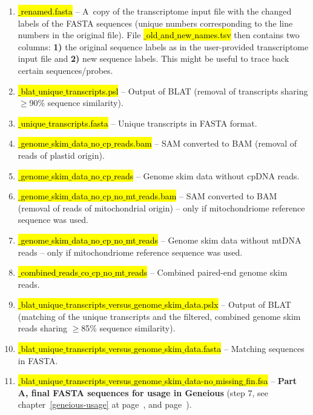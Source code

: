\documentclass[a4paper, 11pt, twoside]{article}
\renewcommand{\texttt}[1]{\hl{\ttfamily #1}}
\begin{document}
\begin{enumerate}
  \item \texttt{*$\_$renamed.fasta} -- A~copy of the transcriptome input file with the changed labels of the FASTA sequences (unique numbers corresponding to the line numbers in the original file). File \texttt{*$\_$old$\_$and$\_$new$\_$names.tsv} then contains two columns: \textbf{1)} the original sequence labels as in the user-provided transcriptome input file and \textbf{2)} new sequence labels. This might be useful to trace back certain sequences/probes.
  \item \texttt{*$\_$blat$\_$unique$\_$transcripts.psl} -- Output of BLAT (removal of transcripts sharing $\geq$90\% sequence similarity).
  \item \texttt{*$\_$unique$\_$transcripts.fasta} -- Unique transcripts in FASTA format.
  \item \texttt{*$\_$genome$\_$skim$\_$data$\_$no$\_$cp$\_$reads.bam} -- SAM converted to BAM (removal of reads of plastid origin).
  \item \texttt{*$\_$genome$\_$skim$\_$data$\_$no$\_$cp$\_$reads} -- Genome skim data without cpDNA reads.
  \item \texttt{*$\_$genome$\_$skim$\_$data$\_$no$\_$cp$\_$no$\_$mt$\_$reads.bam} -- SAM converted to BAM (removal of reads of mitochondrial origin)  -- only if mitochondriome reference sequence was used.
  \item \texttt{*$\_$genome$\_$skim$\_$data$\_$no$\_$cp$\_$no$\_$mt$\_$reads} -- Genome skim data without mtDNA reads -- only if mitochondriome reference sequence was used.
  \item \texttt{*$\_$combined$\_$reads$\_$co$\_$cp$\_$no$\_$mt$\_$reads} -- Combined paired-end genome skim reads.
  \item \texttt{*$\_$blat$\_$unique$\_$transcripts$\_$versus$\_$genome$\_$skim$\_$data.pslx} -- Output of BLAT (ma\-tching of the unique transcripts and the filtered, combined genome skim reads sharing $\geq$85\% sequence similarity).
  \item \texttt{*$\_$blat$\_$unique$\_$transcripts$\_$versus$\_$genome$\_$skim$\_$data.fasta} -- Matching sequences in FASTA.
  \item \texttt{*$\_$blat$\_$unique$\_$transcripts$\_$versus$\_$genome$\_$skim$\_$data-no$\_$missing$\_$fin.fsa} -- \textbf{Part A, final FASTA sequences for usage in Geneious} (step 7, see chapter~\ref{geneious-usage} at page~\pageref{geneious-usage}, and page~\pageref{pipeline-overview}).
\end{enumerate}
\end{document}
